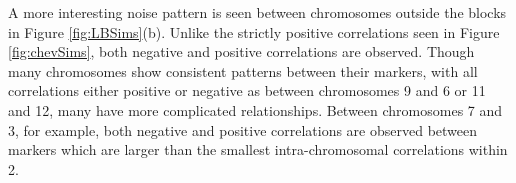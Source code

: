\documentclass{article}
\newcommand{\code}[1]{\texttt{#1}}
\newcommand*{\R}{\textsf{R}$~$}
\newcommand{\m}[1]{\mathbf{#1}}               %
\begin{document}
A more interesting noise pattern is seen between chromosomes outside the blocks in Figure \ref{fig:LBSims}(b). Unlike the strictly positive correlations seen in Figure \ref{fig:chevSims}, both negative and positive correlations are observed. Though many chromosomes show consistent patterns between their markers, with all correlations either positive or negative as between chromosomes 9 and 6 or 11 and 12, many have more complicated relationships. Between chromosomes 7 and 3, for example, both negative and positive correlations are observed between markers which are larger than the smallest intra-chromosomal correlations within 2.





\end{document}
